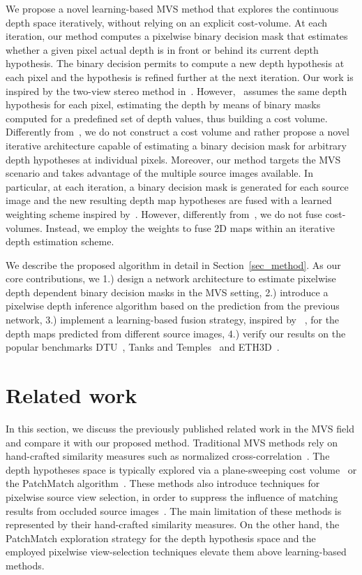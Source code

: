\documentclass{bmvc2k}
\begin{document}
We propose a novel learning-based MVS method that explores the continuous depth space iteratively, without relying on an explicit cost-volume.
At each iteration, our method computes a pixelwise binary decision mask that estimates whether a given pixel actual depth is in front or behind its current depth hypothesis.
The binary decision permits to compute a new depth hypothesis at each pixel and the hypothesis is refined further at the next iteration.
Our work is inspired by the two-view stereo method in~\cite{bi3d_stereo}. However,~\cite{bi3d_stereo} assumes the same depth hypothesis for each pixel, estimating the depth by means of binary masks computed for a predefined set of depth values, thus building a cost volume.
Differently from~\cite{bi3d_stereo}, we do not construct a cost volume and rather propose a novel iterative architecture capable of estimating a binary decision mask for arbitrary depth hypotheses at individual pixels.
Moreover, our method targets the MVS scenario and takes advantage of the multiple source images available.
In particular, at each iteration, a binary decision mask is generated for each source image and the new resulting depth map hypotheses are fused with a learned weighting scheme inspired by~\cite{vismvsnet}. 
However, differently from~\cite{vismvsnet}, we do not fuse cost-volumes. Instead, we employ the weights to fuse 2D maps within an iterative depth estimation scheme.

We describe the proposed algorithm in detail in Section~\ref{sec_method}.
As our core contributions, we
1.) design a network architecture to estimate pixelwise depth dependent binary decision masks in the MVS setting,
2.) introduce a pixelwise depth inference algorithm
based on the prediction from the previous network,
3.)
implement a learning-based fusion strategy, inspired by ~\cite{vismvsnet}, for the depth maps predicted from different source images,
4.)
verify our results on the popular benchmarks DTU~\cite{dtu}, Tanks and Temples~\cite{tanksandtemples} and ETH3D~\cite{eth3d}.
\vspace{-1em}
\section{Related work}
In this section, we discuss the previously published related work in the MVS field and compare it with our proposed method. Traditional MVS methods rely on hand-crafted similarity measures such as normalized cross-correlation~\cite{colmap_mvs}.
The depth hypotheses space is typically explored via a plane-sweeping cost volume~\cite{plane_sweep_mvs} or the PatchMatch algorithm~\cite{colmap_mvs,gipuma,acmm, pcf_mvs}.
These methods also introduce techniques for pixelwise source view selection, in order to suppress the influence of matching results from occluded source images~\cite{colmap_mvs, acmm}.
The main limitation of these methods is represented by their hand-crafted similarity measures.
On the other hand, the PatchMatch exploration strategy for the depth hypothesis space and the employed pixelwise view-selection techniques elevate them above learning-based methods.
\end{document}
